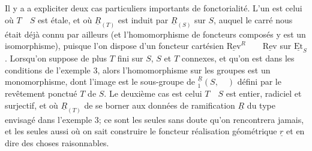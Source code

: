Il y a a expliciter deux cas particuliers importants de fonctorialité. L'un est celui où $T\quad S$ est étale, et où $\underline R_{(T)}$ est induit par $\underline R_{(S)}$ sur $S$, auquel le  carré nous était déjà connu par ailleurs (et l'homomorphisme de foncteurs composés y est un isomorphisme), puisque l'on dispose d'un foncteur cartésien $\underline{\mathrm{Rev}}^{R}\qquad\underline{\mathrm{Rev}}$ sur $\underline{\mathrm{Et}}_S$. Lorsqu'on suppose de plus $T$ fini sur $S$, $S$ et $T$ connexes, et qu'on est dans les conditions de l'exemple 3, alors l'homomorphisme sur les groupes  est un monomorphisme, dont l'image est le sous-groupe de $ {}_{1}^{\underline R}(S,\quad)$ défini par le revêtement ponctué $T$ de $S$. Le deuxième cas est celui  $T\quad S$ est   entier, radiciel et surjectif, et où $\underline R_{(T)}$
de se borner aux données de ramification $\underline R$ du type envisagé dans l'exemple 3; ce sont les seules sans doute qu'on rencontrera jamais, et les seules aussi où on sait construire le foncteur réalisation géométrique $\underline r$ et en dire des choses raisonnables.

